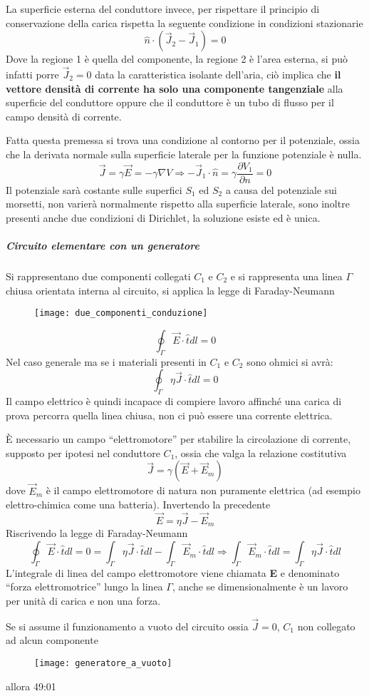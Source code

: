 La superficie esterna del conduttore invece, per rispettare il
principio di conservazione della carica rispetta la seguente
condizione in condizioni stazionarie
$$
\hat{n}\cdot\left(\vec{J}_2-\vec{J}_1\right) = 0
$$
Dove la regione 1 è quella del componente, la regione 2 è l'area
esterna, si può infatti porre $\vec{J}_2=0$ data la caratteristica
isolante dell'aria, ciò implica che \textbf{il vettore densità di corrente ha solo una componente tangenziale} alla superficie del conduttore
oppure che il conduttore è un tubo di flusso per il campo densità di 
corrente.

Fatta questa premessa si trova una condizione al contorno per il 
potenziale, ossia che la derivata normale sulla superficie laterale
per la funzione potenziale è nulla.
$$
\vec{J} = \gamma\vec{E} = -\gamma\nabla V \Rightarrow -\vec{J}_1\cdot
\hat{n} = \gamma \frac{\partial V_1}{\partial n} = 0
$$
Il potenziale sarà costante sulle superfici $S_1$ ed $S_2$ a causa
del potenziale sui morsetti, non varierà normalmente rispetto
alla superficie laterale, sono inoltre presenti anche due condizioni 
di Dirichlet, la soluzione esiste ed è unica.

\subparagraph{Circuito elementare con un generatore}
Si rappresentano due componenti collegati $C_1$ e $C_2$ e si 
rappresenta una linea $\Gamma$ chiusa orientata interna al circuito,
si applica la legge di Faraday-Neumann
\begin{figure}[H]
\centering
\texttt{[image: due\_componenti\_conduzione]}
\end{figure}
$$
\oint_\Gamma\vec{E}\cdot\hat{t}dl = 0
$$
Nel caso generale ma se i materiali presenti in $C_1$ e $C_2$ sono
ohmici si avrà:
$$
\oint_\Gamma \eta\vec{J}\cdot\hat{t}dl = 0
$$
Il campo elettrico è quindi incapace di compiere lavoro affinché una 
carica di prova percorra quella linea chiusa, non ci può essere una 
corrente elettrica.

È necessario un campo ``elettromotore'' per stabilire la circolazione
di corrente, supposto per ipotesi nel conduttore $C_1$, ossia che
valga la relazione costitutiva
$$
\vec{J} = \gamma \left(\vec{E}+\vec{E}_m\right)
$$
dove $\vec{E}_m$ è il campo elettromotore di natura non puramente
elettrica (ad esempio elettro-chimica come una batteria).
Invertendo la precedente
$$
\vec{E} = \eta\vec{J} - \vec{E}_m
$$
Riscrivendo la legge di Faraday-Neumann
$$
\oint_{\Gamma}\vec{E}\cdot\hat{t}dl =  0 = \int_\Gamma \eta\vec{J}
\cdot\hat{t}dl - \int_\Gamma \vec{E}_m \cdot \hat{t}dl\Rightarrow
\int_\Gamma \vec{E}_m\cdot\hat{t}dl = \int_\Gamma \eta\vec{J}
\cdot\hat{t}dl
$$
L'integrale di linea del campo elettromotore viene chiamata
\textbf{E} e denominato ``forza elettromotrice'' lungo
la linea $\Gamma$, anche se dimensionalmente è un lavoro per unità
di carica e non una forza.

Se si assume il funzionamento a vuoto del circuito ossia $\vec{J} = 
0$, $C_1$ non collegato ad alcun componente 
\begin{figure}[H]
\centering
\texttt{[image: generatore\_a\_vuoto]}
\end{figure}
allora
49:01
